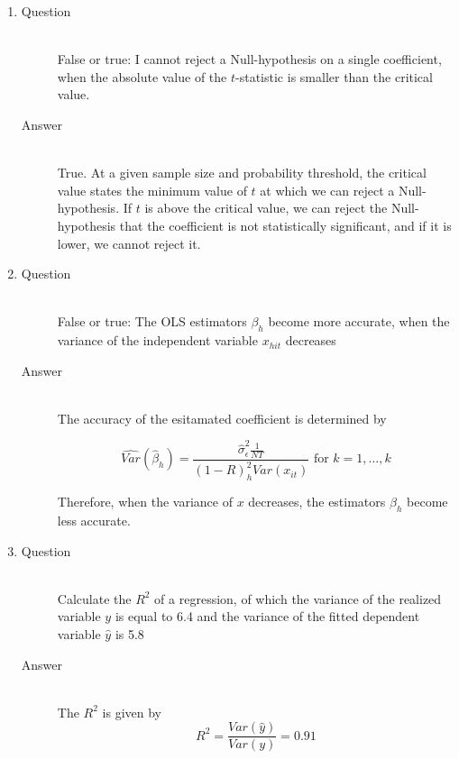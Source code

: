 \documentclass{article}
\begin{document}
\begin{enumerate}
  \item
  \begin{description}
    \item[Question] \hfill \\
    False or true: I cannot reject a Null-hypothesis on a single coefficient, when the absolute value of the $t$-statistic is smaller than the critical value.
    \item[Answer] \hfill \\
    True. At a given sample size and probability threshold, the critical value states the minimum value of $t$ at which we can reject a Null-hypothesis. If $t$ is above the critical value, we can reject the Null-hypothesis that the coefficient is not statistically significant, and if it is lower, we cannot reject it.
  \end{description}
  
  \item
  \begin{description}
    \item[Question] \hfill \\
    False or true: The OLS estimators $\beta_h$ become more accurate, when the variance of the independent variable $x_{hit}$ decreases
    \item[Answer] \hfill \\
    The accuracy of the esitamated coefficient is determined by 
    
    \begin{displaymath}
    \hat{Var}(\hat{\beta}_{h}) = \frac{\hat{\sigma}_{\epsilon}^{2} \frac{1}{NT}} {(1 - R)^{2}_{h}Var(x_{it}) }
    \text{ for } k = 1,\ldots,k
    \end{displaymath}
    
    Therefore, when the variance of $x$ decreases, the estimators $\beta_h$ become less accurate.
    
  \end{description}
  
  \item
  \begin{description}
    \item[Question] \hfill \\
    Calculate the $R^2$ of a regression, of which the variance of the realized variable $y$ is equal to 6.4 and the variance of the fitted dependent variable $\hat{y}$ is 5.8
    \item[Answer] \hfill \\
    The $R^2$ is given by
    \[R^2 = \frac{Var(\hat{y})}{Var(y)} = 0.91 \] 
  \end{description}
  

\end{enumerate}
\end{document}
